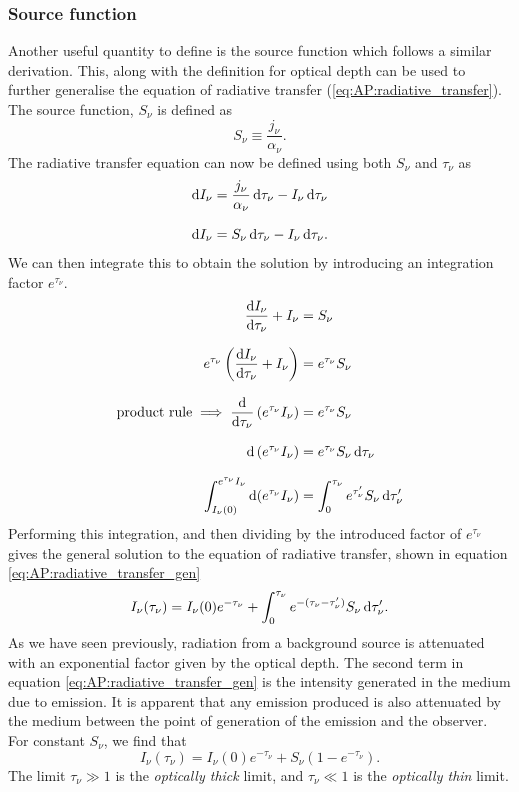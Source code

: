 \subsubsection{Source function}
Another useful quantity to define is the source function which follows a similar derivation. %
This, along with the definition for optical depth can be used to further generalise the equation of radiative transfer (\ref{eq:AP:radiative_transfer}).
 The source function, $S_\nu$ is defined as
%
\begin{equation}
	S_\nu \equiv \frac{j_\nu}{\alpha_\nu}.
\end{equation}
%
The radiative transfer equation can now be defined using both $S_\nu$ and $\tau_\nu$ as
%
\begin{align*}
	\diff I_\nu &= \frac{j_\nu}{\alpha_\nu} \diff \tau_\nu - I_\nu \diff \tau_\nu
	\linedrop
	\diff I_\nu &= S_\nu \diff \tau_\nu - I_\nu \diff \tau_\nu.
\end{align*}
%
We can then integrate this to obtain the solution by introducing an integration factor $e^{\tau_\nu}$.
%
\begin{align*}
	\frac{\diff I_\nu}{\diff \tau_\nu} + I_\nu &= S_\nu
	\linedrop
	e^{\tau_\nu} \left( \frac{\diff I_\nu}{\diff \tau_\nu} + I_\nu \right) &= e^{\tau_\nu} S_\nu
	\linedrop
	\text{product rule} \implies 
	\frac{\diff}{\diff \tau_\nu} \left( e^{\tau_\nu} I_\nu \right) &= e^{\tau_\nu} S_\nu
	\linedrop
	\diff \left( e^{\tau_\nu} I_\nu \right) &= e^{\tau_\nu} S_\nu \diff \tau_\nu
	\linedrop
	\int_{I_\nu (0)}^{e^{\tau_\nu} I_\nu} \diff (e^{\tau_\nu} I_\nu) &= \int_{0}^{\tau_\nu} e^{\tau^{\prime}_\nu} S_\nu \diff \tau^\prime_\nu
\end{align*}
%
Performing this integration, and then dividing by the introduced factor of $e^{\tau_\nu}$ gives the general solution to the equation of radiative transfer, shown in equation \ref{eq:AP:radiative_transfer_gen}
%
\begin{equation}
	I_\nu (\tau_\nu) = I_\nu (0) e^{-\tau_\nu} + \int_{0}^{\tau_\nu} e^{-(\tau_\nu - \tau^\prime_\nu)} S_\nu \mathop{}\!\mathrm{d} \tau^\prime_\nu.
	\label{eq:AP:radiative_transfer_gen}
\end{equation}
%
As we have seen previously, radiation from a background source is attenuated with an exponential factor given by the optical depth.
 The second term in equation \ref{eq:AP:radiative_transfer_gen} is the intensity generated in the medium due to emission.
 It is apparent that any emission produced is also attenuated by the medium between the point of generation of the emission and the observer.
 For constant $S_\nu$, we find that
%
\begin{equation}
	I_\nu (\tau_\nu) = I_\nu (0) e^{-\tau_\nu} + S_\nu (1 - e^{-\tau_\nu}).
	\label{eq:AP:radiative_const_S}
\end{equation}
%
The limit $\tau_\nu \gg 1$ is the \emph{optically thick} limit, and $\tau_\nu \ll 1$ is the \emph{optically thin} limit.
%
%
%
